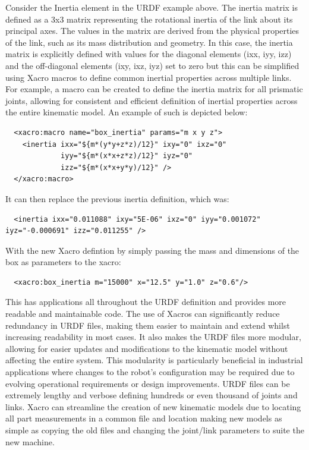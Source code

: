 \documentclass[10pt,a4paper,english]{article}
\begin{document}
Consider the Inertia element in the URDF example above. The inertia matrix is defined as a 3x3 matrix representing the rotational inertia of the link about its principal axes. The values in the matrix are derived from the physical properties of the link, such as its mass distribution and geometry. In this case, the inertia matrix is explicitly defined with values for the diagonal elements (ixx, iyy, izz) and the off-diagonal elements (ixy, ixz, iyz) set to zero but this can be simplified using Xacro macros to define common inertial properties across multiple links. For example, a macro can be created to define the inertia matrix for all prismatic joints, allowing for consistent and efficient definition of inertial properties across the entire kinematic model. An example of such is depicted below:

\begin{verbatim}
  <xacro:macro name="box_inertia" params="m x y z">
    <inertia ixx="${m*(y*y+z*z)/12}" ixy="0" ixz="0"
             iyy="${m*(x*x+z*z)/12}" iyz="0"
             izz="${m*(x*x+y*y)/12}" />
  </xacro:macro>
\end{verbatim}

It can then replace the previous inertia definition, which was:
\begin{verbatim}
  <inertia ixx="0.011088" ixy="5E-06" ixz="0" iyy="0.001072" iyz="-0.000691" izz="0.011255" />
\end{verbatim}
\noindent
With the new Xacro defintion by simply passing the mass and dimensions of the box as parameters to the xacro:
\begin{verbatim}
  <xacro:box_inertia m="15000" x="12.5" y="1.0" z="0.6"/>
\end{verbatim}

This has applications all throughout the URDF definition and provides more readable and maintainable code. The use of Xacros can significantly reduce redundancy in URDF files, making them easier to maintain and extend whilst increasing readability in most cases. It also makes the URDF files more modular, allowing for easier updates and modifications to the kinematic model without affecting the entire system. This modularity is particularly beneficial in industrial applications where changes to the robot's configuration may be required due to evolving operational requirements or design improvements. URDF files can be extremely lengthy and verbose defining hundreds or even thousand of joints and links. Xacro can streamline the creation of new kinematic models due to locating all part measurements in a common file and location making new models as simple as copying the old files and changing the joint/link parameters to suite the new machine.
\end{document}

